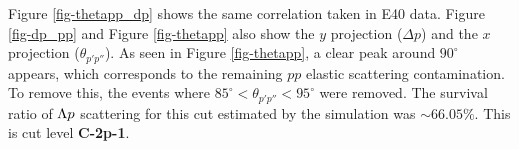 Figure \ref{fig-thetapp_dp} shows the same correlation taken in E40 data. Figure \ref{fig-dp_pp} and Figure \ref{fig-thetapp} also show the $y$ projection ($\Delta p$) and the $x$ projection ($\theta_{p'p''}$). As seen in Figure \ref{fig-thetapp}, a clear peak around $90^{\circ}$ appears, which corresponds to the remaining $pp$ elastic scattering contamination. To remove this, the events where $85^{\circ} < \theta_{p'p''} < 95^{\circ}$ were removed. The survival ratio of $\Lambda p$ scattering for this cut estimated by the simulation was $\sim66.05\%$. This is cut level {\bf C-2p-1}.

\begin{comment}

\begin{figure}[h]
  \centering
  \texttt{[image: thetapp\_dp\_sim.eps]}
  \caption{Simulations of the correlation plots between the opening angle ($\theta_{p'p''}$) versus $\Delta p$. The upper left shows the sum of all reactions, the upper right shows the $pp$ elastic scattering, the lower left shows the $\Lp$ scattering, and the lower right shows the results of $\Ldecay$ decay scaled to 1/100. }
  \label{fig-thetapp_dp_sim}
\end{figure}

\begin{figure}[!h]
  \centering
  \texttt{[image: thetapp\_dp.eps]}
  \caption{Correlation plot between the opening angle ($\theta_{pp}$) versus $\Delta p$ for the $pp$ elastic scattering, taken in E40 data.}
   \label{fig-thetapp_dp}
\end{figure}

\begin{figure}[!h]
  \begin{minipage}[t]{0.48\columnwidth}
    \centering
    \texttt{[image: dp\_pp.eps]}
    \caption{$\Delta p$ for the $pp$ elastic scattering, taken in E40 data.}
    \label{fig-dp_pp}
  \end{minipage}
  \hspace{0.04\columnwidth} %
  \begin{minipage}[t]{0.48\columnwidth}
    \centering
    \texttt{[image: thetapp.eps]}
    \caption{Opening angle between recoil proton and scattered proton assuming $pp$ elastic scattering, taken in E40 data. A cut for $\theta_{p'p''}$ was made at $85^{\circ} < \theta_{p'p''} < 95^{\circ}$, as represented by the red solid lines. The survival ratio of $\Lp$ scattering for this cut was estimated as $\sim66.05\%$. This is cut level {\bf C-2p-1}.}
    \label{fig-thetapp}
  \end{minipage}
\end{figure}

\end{comment}


